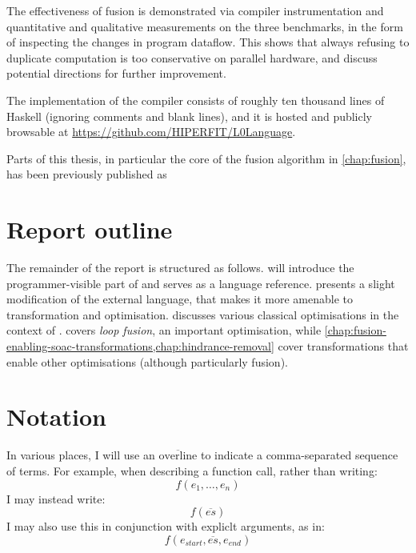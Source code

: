 The effectiveness of fusion is demonstrated via compiler
instrumentation and quantitative and qualitative measurements on the
three benchmarks, in the form of inspecting the changes in program
dataflow.  This shows that always refusing to duplicate computation is
too conservative on parallel hardware, and discuss potential
directions for further improvement.

The implementation of the \LO{} compiler consists of roughly ten
thousand lines of Haskell (ignoring comments and blank lines), and it
is hosted and publicly browsable at
\url{https://github.com/HIPERFIT/L0Language}.

Parts of this thesis, in particular the core of the fusion algorithm
in \cref{chap:fusion}, has been previously published as

\begin{quote}
\end{quote}

\section{Report outline}

The remainder of the report is structured as follows.
 will introduce the
programmer-visible part of \LO{} and serves as a language reference.
 presents a slight modification of the external
language, that makes it more amenable to transformation and
optimisation.   discusses various
classical optimisations in the context of \LO{}.  
covers \textit{loop fusion}, an important optimisation, while
\cref{chap:fusion-enabling-soac-transformations,chap:hindrance-removal}
cover transformations that enable other optimisations (although
particularly fusion).

\section{Notation}

In various places, I will use an \(\overline{\text{overline}}\) to
indicate a comma-separated sequence of terms.  For example, when
describing a function call, rather than writing:
\[
f(e_{1},\ldots,e_{n})
\]
I may instead write:
\[
f(\overline{es})
\]
I may also use this in conjunction with expliclt arguments, as in:
\[
f(e_{start},\overline{es},e_{end})
\]


